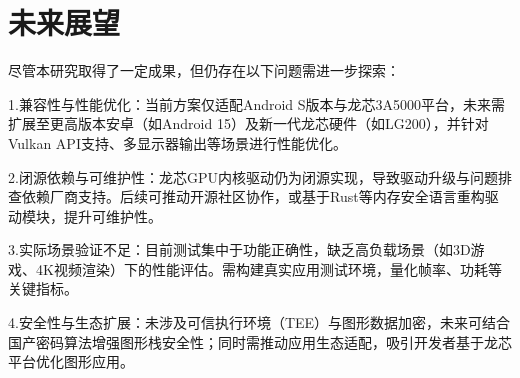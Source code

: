 \section{未来展望}

尽管本研究取得了一定成果，但仍存在以下问题需进一步探索：

1.兼容性与性能优化：当前方案仅适配Android S版本与龙芯3A5000平台，未来需扩展至更高版本安卓（如Android 15）及新一代龙芯硬件（如LG200），并针对Vulkan API支持、多显示器输出等场景进行性能优化。

2.闭源依赖与可维护性：龙芯GPU内核驱动仍为闭源实现，导致驱动升级与问题排查依赖厂商支持。后续可推动开源社区协作，或基于Rust等内存安全语言重构驱动模块，提升可维护性。

3.实际场景验证不足：目前测试集中于功能正确性，缺乏高负载场景（如3D游戏、4K视频渲染）下的性能评估。需构建真实应用测试环境，量化帧率、功耗等关键指标。

4.安全性与生态扩展：未涉及可信执行环境（TEE）与图形数据加密，未来可结合国产密码算法增强图形栈安全性；同时需推动应用生态适配，吸引开发者基于龙芯平台优化图形应用。
